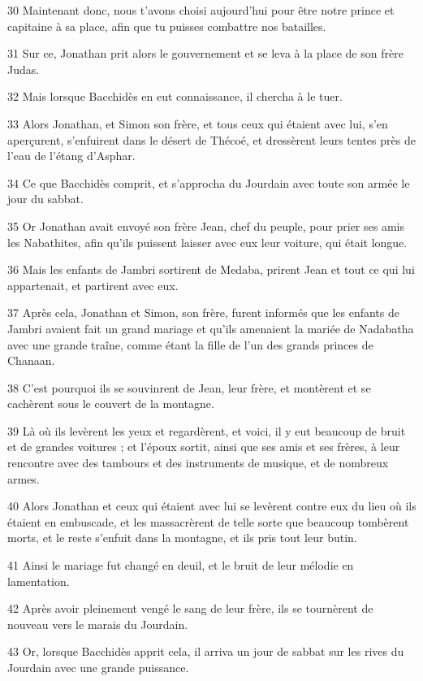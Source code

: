 \par 30 Maintenant donc, nous t'avons choisi aujourd'hui pour être notre prince et capitaine à sa place, afin que tu puisses combattre nos batailles.
\par 31 Sur ce, Jonathan prit alors le gouvernement et se leva à la place de son frère Judas.
\par 32 Mais lorsque Bacchidès en eut connaissance, il chercha à le tuer.
\par 33 Alors Jonathan, et Simon son frère, et tous ceux qui étaient avec lui, s'en aperçurent, s'enfuirent dans le désert de Thécoé, et dressèrent leurs tentes près de l'eau de l'étang d'Asphar.
\par 34 Ce que Bacchidès comprit, et s'approcha du Jourdain avec toute son armée le jour du sabbat.
\par 35 Or Jonathan avait envoyé son frère Jean, chef du peuple, pour prier ses amis les Nabathites, afin qu'ils puissent laisser avec eux leur voiture, qui était longue.
\par 36 Mais les enfants de Jambri sortirent de Medaba, prirent Jean et tout ce qui lui appartenait, et partirent avec eux.
\par 37 Après cela, Jonathan et Simon, son frère, furent informés que les enfants de Jambri avaient fait un grand mariage et qu'ils amenaient la mariée de Nadabatha avec une grande traîne, comme étant la fille de l'un des grands princes de Chanaan.
\par 38 C'est pourquoi ils se souvinrent de Jean, leur frère, et montèrent et se cachèrent sous le couvert de la montagne.
\par 39 Là où ils levèrent les yeux et regardèrent, et voici, il y eut beaucoup de bruit et de grandes voitures ; et l'époux sortit, ainsi que ses amis et ses frères, à leur rencontre avec des tambours et des instruments de musique, et de nombreux armes.
\par 40 Alors Jonathan et ceux qui étaient avec lui se levèrent contre eux du lieu où ils étaient en embuscade, et les massacrèrent de telle sorte que beaucoup tombèrent morts, et le reste s'enfuit dans la montagne, et ils pris tout leur butin.
\par 41 Ainsi le mariage fut changé en deuil, et le bruit de leur mélodie en lamentation.
\par 42 Après avoir pleinement vengé le sang de leur frère, ils se tournèrent de nouveau vers le marais du Jourdain.
\par 43 Or, lorsque Bacchidès apprit cela, il arriva un jour de sabbat sur les rives du Jourdain avec une grande puissance.
